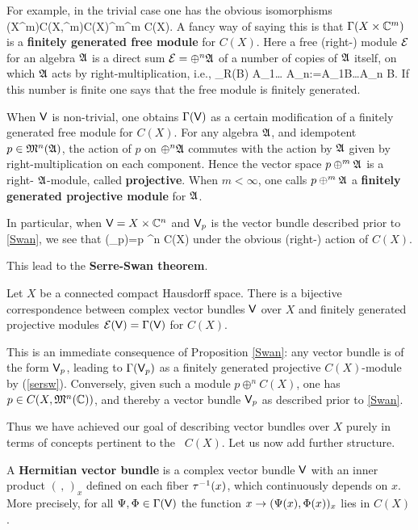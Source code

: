 For example, in the trivial case one has the obvious isomorphisms \be
\Gm(X\x \C^m)\simeq C(X,\C^m)\simeq C(X)\ot\C^m\simeq \oplus^m C(X).
\ee A fancy way of saying this is that $\Gamma(X\times {\Bbb C}^m)$ is a {\bf
finitely generated free module} for $C(X)$.  Here a free (right-)
module ${\cal E}$ for an algebra ${\frak A}$ is a direct sum ${\cal E}=\oplus^n{\frak A}$ of a
number of copies of ${\frak A}$ itself, on which ${\frak A}$ acts by
right-multiplication, i.e., \be \pi_R(B) A_1\oplus\ldots \oplus
A_n:=A_1B\oplus\ldots \oplus A_n B.  \ee If this number is finite one
says that the free module is finitely generated.

When ${\sf V}$ is non-trivial, one obtains $\Gamma({\sf V})$ as a certain
modification of a finitely generated free module for $C(X)$. For any
algebra ${\frak A}$, and idempotent $p\in {\frak M}^n({\frak A})$, the action of $p$ on
$\oplus^n {\frak A}$ commutes with the action by ${\frak A}$ given by
right-multiplication on each component.  Hence the vector space $p
\oplus^m {\frak A}$ is a right- ${\frak A}$-module, called {\bf projective}. When
$m<\infty$, one calls $p \oplus^m {\frak A}$ a {\bf finitely generated
projective module} for ${\frak A}$.

In particular, when ${\sf V}=X\times{\Bbb C}^n$ and ${\sf V}_p$ is the vector bundle
described prior to \ref{Swan}, we see that \be \Gm(\SV_p)=p \oplus^n
C(X)  \ee under the obvious (right-) action of $C(X)$.

This lead to the {\bf Serre-Swan theorem}.
\begin{Theorem}
Let $X$ be a connected compact Hausdorff space. There is a bijective
correspondence between complex vector bundles ${\sf V}$ over $X$ and finitely
generated projective modules ${\cal E}({\sf V})=\Gamma({\sf V})$ for $C(X)$.
\end{Theorem}

This is an immediate consequence of Proposition \ref{Swan}: any vector
bundle is of the form ${\sf V}_p$, leading to $\Gamma({\sf V}_p)$ as a finitely
generated projective $C(X)$-module by (\ref{sersw}).  Conversely,
given such a module $p \oplus^n C(X)$, one has $p\in C(X,{\frak M}^n({\Bbb C}))$,
and thereby a vector bundle ${\sf V}_p$ as described prior to
\ref{Swan}.\enp

Thus we have achieved our goal of describing vector bundles over $X$
purely in terms of concepts pertinent to the \ca\ $C(X)$.
Let us now add further structure.
\begin{Definition}
A {\bf Hermitian vector bundle} is a complex vector bundle ${\sf V}$ with
an inner product $(\, ,\,)_x$ defined on each fiber $\tau^{-1}(x)$,
which continuously depends on $x$.  More precisely, for all
$\Psi,\Phi\in\Gamma({\sf V})$ the function $x\rightarrow (\Psi(x),\Phi(x))_x$ lies in
$C(X)$.
\end{Definition}

